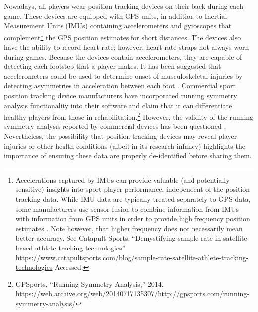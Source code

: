 Nowadays, all players wear position tracking devices on their back during each game. These devices are equipped with GPS units, in addition to Inertial Measurement Units (IMUs) containing accelerometers and gyroscopes that complement\footnote{Accelerations captured by IMUs can provide valuable \cite{Neville2010} (and potentially sensitive) insights into sport player performance, independent of the position tracking data. While IMU data are typically treated separately to GPS data, some manufacturers use sensor fusion to combine information from IMUs with information from GPS units in order to provide high frequency position estimates \cite{Aughey2011}. Note however, that higher frequency does not necessarily mean better accuracy. See Catapult Sports, ``Demystifying sample rate in satellite-based athlete tracking technologies'' \url{https://www.catapultsports.com/blog/sample-rate-satellite-athlete-tracking-technologies} Accessed: } the GPS position estimates for short distances. The devices also have the ability to record heart rate; however, heart rate straps not always worn during games. Because the devices contain accelerometers, they are capable of detecting each footstep that a player makes. It has been suggested that accelerometers could be used to determine onset of musculoskeletal injuries by detecting asymmetries in acceleration between each foot \cite{Williamson2013}. Commercial sport position tracking device manufacturers have incorporated running symmetry analysis functionality into their software and claim that it can differentiate healthy players from those in rehabilitation.\footnote{GPSports, ``Running Symmetry Analysis,'' 2014. \url{https://web.archive.org/web/20140717135307/http://gpsports.com/running-symmetry-analysis/}} However, the validity of the running symmetry analysis reported by commercial devices has been questioned \cite{Kenneally-Dabrowski2018}. Nevertheless, the possibility that position tracking devices may reveal player injuries or other health conditions (albeit in its research infancy) highlights the importance of ensuring these data are properly de-identified before sharing them.


